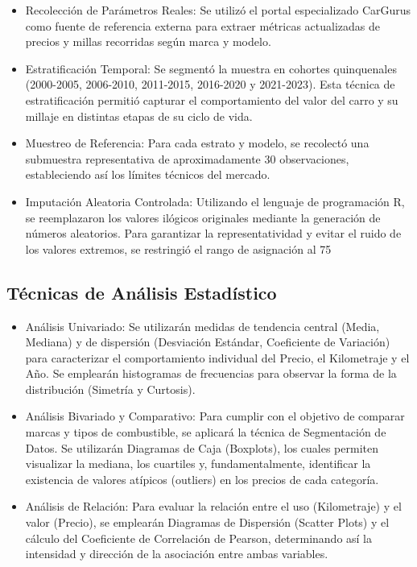 \documentclass[oneside,11pt]{Latex/Classes/PhDthesisPSnPDF}
\begin{document}
\begin{itemize}

 \item Recolección de Parámetros Reales: Se utilizó el portal especializado CarGurus como fuente de referencia externa para extraer métricas actualizadas de precios y millas recorridas según marca y modelo.

 \item Estratificación Temporal: Se segmentó la muestra en cohortes quinquenales (2000-2005, 2006-2010, 2011-2015, 2016-2020 y 2021-2023). Esta técnica de estratificación permitió capturar el comportamiento del valor del carro y su millaje en distintas etapas de su ciclo de vida.

 \item Muestreo de Referencia: Para cada estrato y modelo, se recolectó una submuestra representativa de aproximadamente 30 observaciones, estableciendo así los límites técnicos del mercado.

 \item Imputación Aleatoria Controlada: Utilizando el lenguaje de programación R, se reemplazaron los valores ilógicos originales mediante la generación de números aleatorios. Para garantizar la representatividad y evitar el ruido de los valores extremos, se restringió el rango de asignación al 75%
\end{itemize}

\subsection {Técnicas de Análisis Estadístico}

\begin{itemize}
 \item Análisis Univariado: Se utilizarán medidas de tendencia central (Media, Mediana) y de dispersión (Desviación Estándar, Coeficiente de Variación) para caracterizar el comportamiento individual del Precio, el Kilometraje y el Año. Se emplearán histogramas de frecuencias para observar la forma de la distribución (Simetría y Curtosis).

 \item Análisis Bivariado y Comparativo: Para cumplir con el objetivo de comparar marcas y tipos de combustible, se aplicará la técnica de Segmentación de Datos. Se utilizarán Diagramas de Caja (Boxplots), los cuales permiten visualizar la mediana, los cuartiles y, fundamentalmente, identificar la existencia de valores atípicos (outliers) en los precios de cada categoría.

 \item Análisis de Relación: Para evaluar la relación entre el uso (Kilometraje) y el valor (Precio), se emplearán Diagramas de Dispersión (Scatter Plots) y el cálculo del Coeficiente de Correlación de Pearson, determinando así la intensidad y dirección de la asociación entre ambas variables.
\end{itemize}
\end{document}
